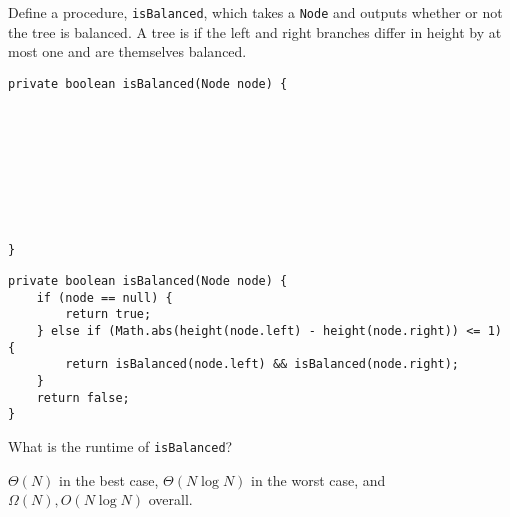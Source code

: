 \question Define a procedure, \texttt{isBalanced}, which takes a \texttt{Node} and outputs whether or not the tree is balanced. A tree is  if the left and right branches differ in height by at most one and are themselves balanced.

\ifprintanswers
\else
\begin{lstlisting}
private boolean isBalanced(Node node) {









}
\end{lstlisting}
\fi

\begin{solution}
\begin{lstlisting}
private boolean isBalanced(Node node) {
    if (node == null) {
        return true;
    } else if (Math.abs(height(node.left) - height(node.right)) <= 1) {
        return isBalanced(node.left) && isBalanced(node.right);
    }
    return false;
}
\end{lstlisting}
\end{solution}

What is the runtime of \texttt{isBalanced}?
\begin{solution}[0.25in]
$\Theta(N)$ in the best case, $\Theta(N \log N)$ in the worst case, and $\Omega(N), O(N \log N)$ overall.
\end{solution}